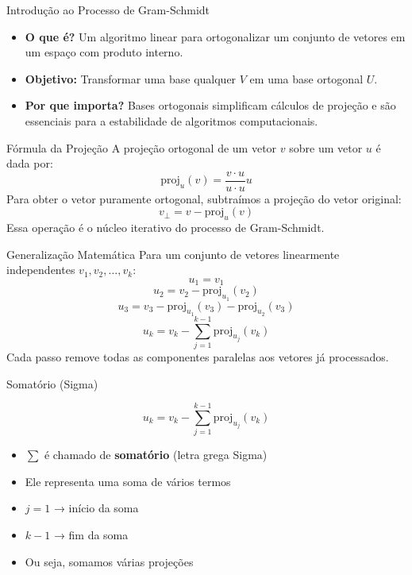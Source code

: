 \documentclass{beamer}
\begin{document}
\begin{frame}{Introdução ao Processo de Gram-Schmidt}
\begin{itemize}
    \item \textbf{O que é?} Um algoritmo linear para ortogonalizar um conjunto de vetores em um espaço com produto interno.
    \item \textbf{Objetivo:} Transformar uma base qualquer $V$ em uma base ortogonal $U$.
    \item \textbf{Por que importa?} Bases ortogonais simplificam cálculos de projeção e são essenciais para a estabilidade de algoritmos computacionais.
\end{itemize}
\end{frame}
\begin{frame}{Fórmula da Projeção}
A projeção ortogonal de um vetor $v$ sobre um vetor $u$ é dada por:
\[
\text{proj}_{u}(v)= \frac{v\cdot u}{u\cdot u}u
\]
Para obter o vetor puramente ortogonal, subtraímos a projeção do vetor original:
\[
v_{\perp}=v-\text{proj}_{u}(v)
\]
Essa operação é o núcleo iterativo do processo de Gram-Schmidt.
\end{frame}
\begin{frame}{Generalização Matemática}
Para um conjunto de vetores linearmente independentes $v_1, v_2, \dots, v_k$:
\[
u_1 = v_1
\]
\[
u_2 = v_2 - \text{proj}_{u_1}(v_2)
\]
\[
u_3 = v_3 - \text{proj}_{u_1}(v_3) - \text{proj}_{u_2}(v_3)
\]
\[
u_k = v_k - \sum_{j=1}^{k-1} \text{proj}_{u_j}(v_k)
\]
Cada passo remove todas as componentes paralelas aos vetores já processados.
\end{frame}
\begin{frame}{Somatório (Sigma)}


\vspace{0.5cm}

\[
u_k = v_k - \sum_{j=1}^{k-1} \mathrm{proj}_{u_j}(v_k)
\]

\vspace{0.5cm}

\begin{itemize}
    \item $\sum$ é chamado de \textbf{somatório} (letra grega Sigma)
    \item Ele representa uma soma de vários termos
\end{itemize}

\vspace{0.5cm}

\begin{itemize}
    \item $j=1$ → início da soma
    \item $k-1$ → fim da soma
\end{itemize}

\vspace{0.5cm}

\begin{itemize}
    \item Ou seja, somamos várias projeções
\end{itemize}

\end{frame}
\end{document}
